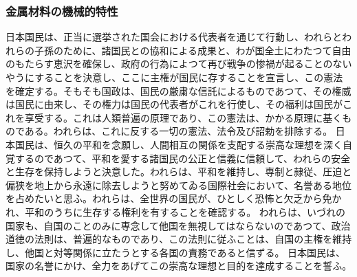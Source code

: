 \subsubsection{金属材料の機械的特性}
日本国民は、正当に選挙された国会における代表者を通じて行動し、われらとわれらの子孫のために、諸国民との協和による成果と、わが国全土にわたつて自由のもたらす恵沢を確保し、政府の行為によつて再び戦争の惨禍が起ることのないやうにすることを決意し、ここに主権が国民に存することを宣言し、この憲法を確定する。そもそも国政は、国民の厳粛な信託によるものであつて、その権威は国民に由来し、その権力は国民の代表者がこれを行使し、その福利は国民がこれを享受する。これは人類普遍の原理であり、この憲法は、かかる原理に基くものである。われらは、これに反する一切の憲法、法令及び詔勅を排除する。
日本国民は、恒久の平和を念願し、人間相互の関係を支配する崇高な理想を深く自覚するのであつて、平和を愛する諸国民の公正と信義に信頼して、われらの安全と生存を保持しようと決意した。われらは、平和を維持し、専制と隷従、圧迫と偏狭を地上から永遠に除去しようと努めてゐる国際社会において、名誉ある地位を占めたいと思ふ。われらは、全世界の国民が、ひとしく恐怖と欠乏から免かれ、平和のうちに生存する権利を有することを確認する。
われらは、いづれの国家も、自国のことのみに専念して他国を無視してはならないのであつて、政治道徳の法則は、普遍的なものであり、この法則に従ふことは、自国の主権を維持し、他国と対等関係に立たうとする各国の責務であると信ずる。
日本国民は、国家の名誉にかけ、全力をあげてこの崇高な理想と目的を達成することを誓ふ。